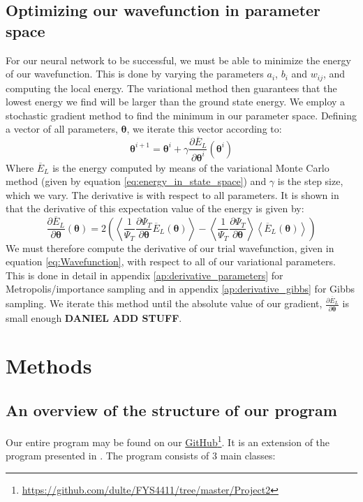 \documentclass[a4paper, 10pt]{article}
\begin{document}
	\subsection{Optimizing our wavefunction in parameter space}
	For our neural network to be successful, we must be able to minimize the energy of our wavefunction. This is done by varying the parameters $a_i$, $b_i$ and $w_{ij}$, and computing the local energy. The variational method then guarantees that the lowest energy we find will be larger than the ground state energy. We employ a stochastic gradient method to find the minimum in our parameter space. Defining a vector of all parameters, $\boldsymbol{\theta}$, we iterate this vector according to:
	\begin{equation}\label{eq:Minimization_theory}
	\boldsymbol{\theta}^{i+1}=\boldsymbol{\theta}^i + \gamma \frac{\partial \overline{E}_L}{\partial \boldsymbol{\theta}^i}(\boldsymbol{\theta}^i)
	\end{equation}
	Where $\overline{E}_L$ is the energy computed by means of the variational Monte Carlo method (given by equation \ref{eq:energy_in_state_space}) and $\gamma$ is the step size, which we vary. The derivative is with respect to all parameters. It is shown in \cite{Heinsen2018} that the derivative of this expectation value of the energy is given by:
	\begin{equation}
	\frac{\partial \overline{E}_L}{\partial \boldsymbol{\theta}}(\boldsymbol{\theta})=2\left(\left\langle \frac{1}{\Psi_T}\frac{\partial \Psi_T}{\partial \boldsymbol{\theta}}\overline{E}_L(\boldsymbol{\theta})\right\rangle-\left\langle \frac{1}{\Psi_T}\frac{\partial \Psi_T}{\partial \boldsymbol{\theta}}\right\rangle\left\langle \overline{E}_L(\boldsymbol{\theta})\right\rangle\right)
	\end{equation}
	We must therefore compute the derivative of our trial wavefunction, given in equation \ref{eq:Wavefunction}, with respect to all of our variational parameters.
	This is done in detail in appendix \ref{ap:derivative_parameters} for Metropolis/importance sampling and in appendix \ref{ap:derivative_gibbs} for Gibbs sampling. We iterate this method until the absolute value of our gradient, $\frac{\partial \overline{E}_L}{\partial \boldsymbol{\theta}}$  is small enough \textbf{DANIEL ADD STUFF}.
	\section{Methods}\label{Method_section}
	\subsection{An overview of the structure of our program}
	Our entire program may be found on our \href{https://github.com/dulte/FYS4411/tree/master/Project2}{GitHub}\footnote{\url{https://github.com/dulte/FYS4411/tree/master/Project2}}. It is an extension of the program presented in \cite{Heinsen2018}. The program consists of $3$ main classes:
\end{document}
